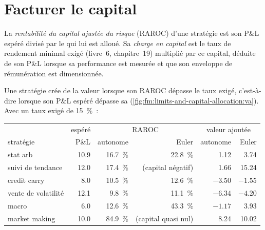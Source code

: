 \label{lst:fm:limits-and-capital-allocation:alloc}

\section{Facturer le capital}

\begin{definition}\label{def:fm:limits-and-capital-allocation:raroc}
La \emph{rentabilité du capital ajustée du risque} (RAROC) d'une stratégie est son P\&L espéré divisé par le
 qui lui est alloué. Sa \emph{charge en capital} est le taux de rendement minimal exigé (livre~6, chapitre~19) multiplié par ce capital,
déduite de son P\&L lorsque sa performance est mesurée et que son enveloppe de rémunération est dimensionnée.
\end{definition}

Une stratégie crée de la valeur lorsque son RAROC dépasse le taux exigé, c'est-à-dire lorsque son P\&L espéré dépasse sa 
(\cref{fig:fm:limits-and-capital-allocation:va}). Avec un taux exigé de 15~\%~:

\begin{center}
\small
\begin{tabular}{@{}lrrrrr@{}}
\toprule
& espéré & \multicolumn{2}{c}{RAROC} & \multicolumn{2}{c}{valeur ajoutée}\\
stratégie & P\&L & autonome & Euler & autonome & Euler\\
\midrule
stat arb & 10.9 & 16.7~\% & 22.8~\% & 1.12 & 3.74\\
suivi de tendance & 12.0 & 17.4~\% & (capital négatif) & 1.66 & 15.24\\
credit carry & 8.0 & 10.5~\% & 12.6~\% & $-3.50$ & $-1.55$\\
vente de volatilité & 12.1 & 9.8~\% & 11.1~\% & $-6.34$ & $-4.20$\\
macro & 6.0 & 12.6~\% & 43.3~\% & $-1.17$ & 3.93\\
market making & 10.0 & 84.9~\% & (capital quasi nul) & 8.24 & 10.02\\
\bottomrule
\end{tabular}
\end{center}

